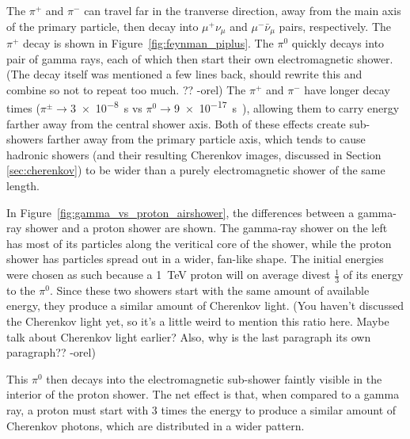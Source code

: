   The $\pi^{+}$ and $\pi^{-}$ can travel far in the tranverse direction, away from the main axis of the primary particle, then decay into $\mu^{+}\nu_{\mu}$ and $\mu^{-}\bar{\nu}_{\mu}$ pairs, respectively.
  The $\pi^{+}$ decay is shown in Figure~\ref{fig:feynman_piplus}.
  The $\pi^{0}$ quickly decays into pair of gamma rays, each of which then start their own electromagnetic shower.
  {\color{red}(The decay itself was mentioned a few lines back, should rewrite this and combine so not to repeat too much. ?? -orel)}
  The $\pi^{+}$ and $\pi^{-}$ have longer decay times ($\pi^{\pm} \rightarrow $\SI{3e-8}{s} vs $\pi^{0} \rightarrow $\SI{9e-17}{s}~\cite{pdg_2014}), allowing them to carry energy farther away from the central shower axis.
  Both of these effects create sub-showers farther away from the primary particle axis, which tends to cause hadronic showers (and their resulting Cherenkov images, discussed in Section \ref{sec:cherenkov}) to be wider than a purely electromagnetic shower of the same length. 
  
  In Figure~\ref{fig:gamma_vs_proton_airshower}, the differences between a gamma-ray shower and a proton shower are shown.
  The gamma-ray shower on the left has most of its particles along the veritical core of the shower, while the proton shower has particles spread out in a wider, fan-like shape.
  The initial energies were chosen as such because a \SI{1}{TeV} proton will on average divest $\frac{1}{3}$ of its energy to the $\pi^{0}$.
  Since these two showers start with the same amount of available energy, they produce a similar amount of Cherenkov light.
  {\color{red}(You haven't discussed the Cherenkov light yet, so it's a little weird to mention this ratio here. Maybe talk about Cherenkov light earlier? Also, why is the last paragraph its own paragraph?? -orel)}

  This $\pi^{0}$ then decays into the electromagnetic sub-shower faintly visible in the interior of the proton shower.
  The net effect is that, when compared to a gamma ray, a proton must start with 3 times the energy to produce a similar amount of Cherenkov photons, which are distributed in a wider pattern.

